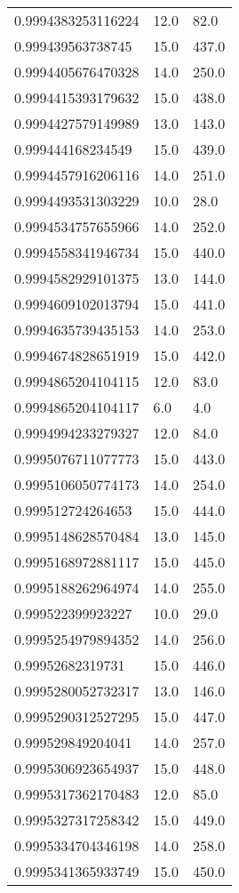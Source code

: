 \begin{center}
\begin{supertabular}[H]{p{0.30\textwidth}p{0.05\textwidth}p{0.05\textwidth}}
0.9994383253116224 & 12.0 & 82.0 \\ 
0.999439563738745 & 15.0 & 437.0 \\ 
0.9994405676470328 & 14.0 & 250.0 \\ 
0.9994415393179632 & 15.0 & 438.0 \\ 
0.9994427579149989 & 13.0 & 143.0 \\ 
0.999444168234549 & 15.0 & 439.0 \\ 
0.9994457916206116 & 14.0 & 251.0 \\ 
0.9994493531303229 & 10.0 & 28.0 \\ 
0.9994534757655966 & 14.0 & 252.0 \\ 
0.9994558341946734 & 15.0 & 440.0 \\ 
0.9994582929101375 & 13.0 & 144.0 \\ 
0.9994609102013794 & 15.0 & 441.0 \\ 
0.9994635739435153 & 14.0 & 253.0 \\ 
0.9994674828651919 & 15.0 & 442.0 \\ 
0.9994865204104115 & 12.0 & 83.0 \\ 
0.9994865204104117 & 6.0 & 4.0 \\ 
0.9994994233279327 & 12.0 & 84.0 \\ 
0.9995076711077773 & 15.0 & 443.0 \\ 
0.9995106050774173 & 14.0 & 254.0 \\ 
0.999512724264653 & 15.0 & 444.0 \\ 
0.9995148628570484 & 13.0 & 145.0 \\ 
0.9995168972881117 & 15.0 & 445.0 \\ 
0.9995188262964974 & 14.0 & 255.0 \\ 
0.999522399923227 & 10.0 & 29.0 \\ 
0.9995254979894352 & 14.0 & 256.0 \\ 
0.99952682319731 & 15.0 & 446.0 \\ 
0.9995280052732317 & 13.0 & 146.0 \\ 
0.9995290312527295 & 15.0 & 447.0 \\ 
0.999529849204041 & 14.0 & 257.0 \\ 
0.9995306923654937 & 15.0 & 448.0 \\ 
0.9995317362170483 & 12.0 & 85.0 \\ 
0.9995327317258342 & 15.0 & 449.0 \\ 
0.9995334704346198 & 14.0 & 258.0 \\ 
0.9995341365933749 & 15.0 & 450.0 \\ 

\end{supertabular}
\end{center}
